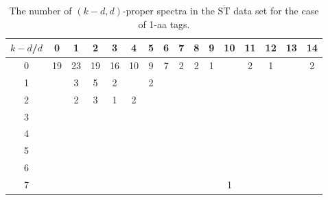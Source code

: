 \documentclass{article}
\def\STbar{{\overline{\mathrm{ST}}}}
\begin{document}
\begin{table}[h]\footnotesize
{\centering
\begin{tabular}{|c|c|
c|c|c|c|c|c|c|c|c|c|c|c|c|c|}
  \hline
  $k-d$/$d$ 
 & 0 & 1 & 2 & 3 & 4 & 5 & 6 & 7 & 8 & 9 & 10 & 11 & 12 & 13 & 14\\

  \hline
  \hline

0  & 19 & 23 & 19 & 16 & 10 & 9 & 7 & 2 & 2 & 1 &  & 2 & 1 &  & 2\\

1  &  & 3 & 5 & 2 &  & 2 &  &  &  &  &  &  &  &  & \\

2  &  & 2 & 3 & 1 & 2 &  &  &  &  &  &  &  &  &  & \\

3  &  &  &  &  &  &  &  &  &  &  &  &  &  &  & \\

4  &  &  &  &  &  &  &  &  &  &  &  &  &  &  & \\

5  &  &  &  &  &  &  &  &  &  &  &  &  &  &  & \\

6  &  &  &  &  &  &  &  &  &  &  &  &  &  &  & \\

7  &  &  &  &  &  &  &  &  &  &  & 1 &  &  &  & \\

  \hline
\end{tabular}
\par}
\centering
\caption{The number of $(k-d,d)$-proper spectra in the $\STbar$ data set for the case of 1-aa tags.}
\vspace{3mm}
\label{table:kd-1-ST}
\end{table}
\end{document}
